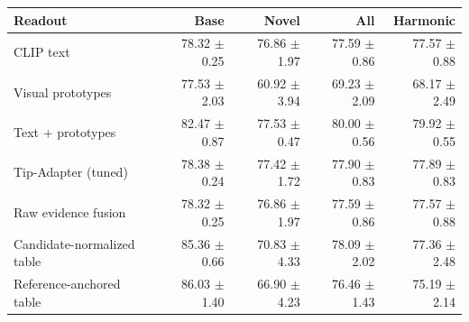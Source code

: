 \begin{tabular}{lrrrr}
\toprule
Readout & Base & Novel & All & Harmonic \\
\midrule
CLIP text & 78.32 $\pm$ 0.25 & 76.86 $\pm$ 1.97 & 77.59 $\pm$ 0.86 & 77.57 $\pm$ 0.88 \\
Visual prototypes & 77.53 $\pm$ 2.03 & 60.92 $\pm$ 3.94 & 69.23 $\pm$ 2.09 & 68.17 $\pm$ 2.49 \\
Text + prototypes & 82.47 $\pm$ 0.87 & 77.53 $\pm$ 0.47 & 80.00 $\pm$ 0.56 & 79.92 $\pm$ 0.55 \\
Tip-Adapter (tuned) & 78.38 $\pm$ 0.24 & 77.42 $\pm$ 1.72 & 77.90 $\pm$ 0.83 & 77.89 $\pm$ 0.83 \\
Raw evidence fusion & 78.32 $\pm$ 0.25 & 76.86 $\pm$ 1.97 & 77.59 $\pm$ 0.86 & 77.57 $\pm$ 0.88 \\
Candidate-normalized table & 85.36 $\pm$ 0.66 & 70.83 $\pm$ 4.33 & 78.09 $\pm$ 2.02 & 77.36 $\pm$ 2.48 \\
Reference-anchored table & 86.03 $\pm$ 1.40 & 66.90 $\pm$ 4.23 & 76.46 $\pm$ 1.43 & 75.19 $\pm$ 2.14 \\
\bottomrule
\end{tabular}